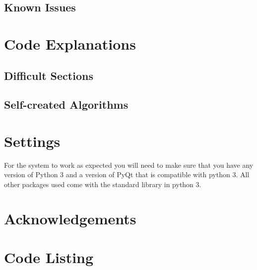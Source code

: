 \subsection{Known Issues}

\section{Code Explanations}

\subsection{Difficult Sections}

\subsection{Self-created Algorithms}

\section{Settings}
For the system to work as expected you will need to make sure that you have any version of Python 3 and a version of PyQt that is compatible with python 3. All other packages used come with the standard library in python 3.
\section{Acknowledgements}

\section{Code Listing}


